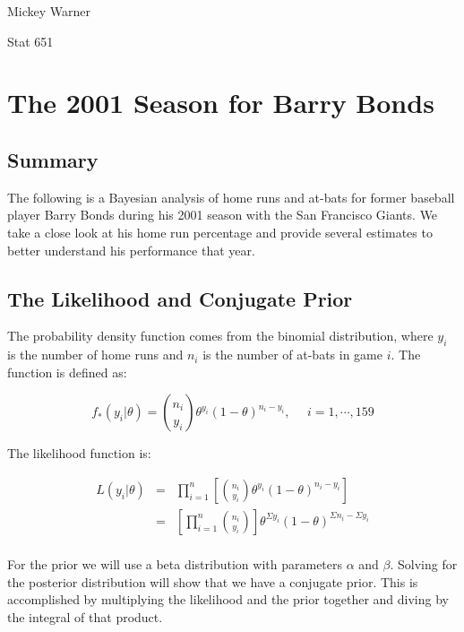 \documentclass[12pt]{article}
\begin{document}
\begin{Large}
\noindent Mickey Warner
\bigskip

\noindent Stat 651
\end{Large}
\bigskip

\section{The 2001 Season for Barry Bonds}

\subsection{Summary}

\noindent The following is a Bayesian analysis of home runs and at-bats for former baseball player Barry Bonds during his 2001 season with the San Francisco Giants.  We take a close look at his home run percentage and provide several estimates to better understand his performance that year.

\subsection{The Likelihood and Conjugate Prior}

The probability density function comes from the binomial distribution, where $y_i$ is the number of home runs and $n_i$ is the number of at-bats in game $i$.  The function is defined as:

\[f_*(y_i|\theta)={n_i \choose y_i}\theta^{y_i}(1-\theta)^{n_i-y_i},\ \ \ \ \ \ i=1,\cdots,159\]

\noindent The likelihood function is:

\begin{eqnarray*}
L(y_i|\theta) &=& \prod_{i=1}^n\left[{n_i \choose y_i}\theta^{y_i}(1-\theta)^{n_i-y_i}\right] \\
&=& \left[\prod_{i=1}^n{n_i \choose y_i}\right]\theta^{\Sigma y_i}(1-\theta)^{\Sigma n_i-\Sigma y_i} \\
\end{eqnarray*}

\noindent For the prior we will use a beta distribution with parameters $\alpha$ and $\beta$.  Solving for the posterior distribution will show that we have a conjugate prior.  This is accomplished by multiplying the likelihood and the prior together and diving by the integral of that product.
\end{document}
